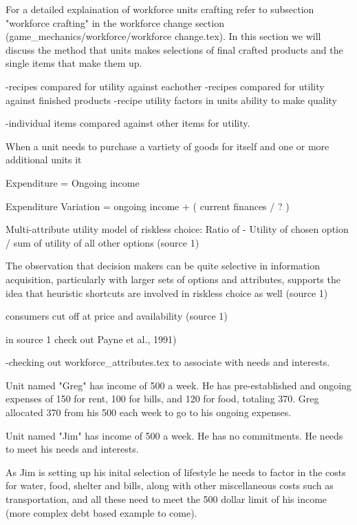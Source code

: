 For a detailed explaination of workforce units crafting refer to subsection "workforce crafting" in the workforce change section (game_mechanics/workforce/workforce change.tex). In this section we will discuss the method that units makes selections of final crafted products and the single items that make them up. 

-recipes compared for utility against eachother
-recipes compared for utility against finished products
-recipe utility factors in units ability to make quality

-individual items compared against other items for utility.




When a unit needs to purchase a vartiety of goods for itself and one or more additional units it
 

Expenditure = Ongoing income 

Expenditure Variation = ongoing income + ( current finances / ? )

Multi-attribute utility model of riskless choice:
Ratio of - Utility of chosen option / sum of utility of all other options (source 1)

The observation that decision makers can be quite selective in information acquisition, particularly with larger sets of options and attributes, supports the idea that heuristic shortcuts are involved in riskless choice as well (source 1)

consumers cut off at price and availability (source 1)

in source 1 check out Payne et al., 1991)


-checking out workforce_attributes.tex to associate with needs and interests.







Unit named "Greg" has income of 500 a week. He has pre-established and ongoing expenses of 150 for rent, 100 for bills, and 120 for food, totaling 370. Greg allocated 370 from his 500 each week to go to his ongoing expenses. 

Unit named "Jim" has income of 500 a week. He has no commitments. He needs to meet his needs and interests. 

As Jim is setting up his inital selection of lifestyle he needs to factor in the costs for water, food, shelter and bills, along with other miscellaneous costs such as transportation, and all these need to meet the 500 dollar limit of his income (more complex debt based example to come).

